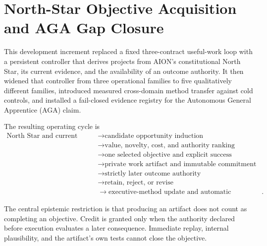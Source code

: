 
\section{North-Star Objective Acquisition and AGA Gap Closure}
\label{sec:aion-objective-acquisition-aga-gap-closure}

This development increment replaced a fixed three-contract useful-work loop
with a persistent controller that derives projects from AION's constitutional
North Star, its current evidence, and the availability of an outcome authority.
It then widened that controller from three operational families to five
qualitatively different families, introduced measured cross-domain method
transfer against cold controls, and installed a fail-closed evidence registry
for the Autonomous General Apprentice (AGA) claim.

The resulting operating cycle is
\begin{equation}
\begin{aligned}
\text{North Star and current evidence}
&\rightarrow \text{candidate opportunity induction} \\
&\rightarrow \text{value, novelty, cost, and authority ranking} \\
&\rightarrow \text{one selected objective and explicit success contract} \\
&\rightarrow \text{private work artifact and immutable commitment} \\
&\rightarrow \text{strictly later outcome authority} \\
&\rightarrow \text{retain, reject, or revise} \\
&\rightarrow \text{executive-method update and automatic continuation}.
\end{aligned}
\label{eq:aion-varied-objective-loop}
\end{equation}

The central epistemic restriction is that producing an artifact does not count
as completing an objective.  Credit is granted only when the authority declared
before execution evaluates a later consequence.  Immediate replay, internal
plausibility, and the artifact's own tests cannot close the objective.

